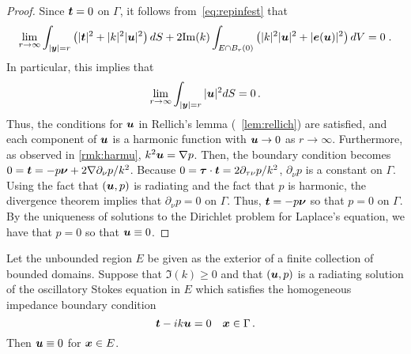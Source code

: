 \begin{proof}
Since ${\boldsymbol t} = 0$ on $\Gamma$, it follows
from~\cref{eq:repinfest} that
\begin{equation}
\lim_{r\to\infty}
\int_{|{\boldsymbol y}|=r} \left( |{\boldsymbol t}|^2 + |k|^2 |{\boldsymbol u}|^2 \right) dS +
2 {\textrm{\textup{Im}}}(k) \int_{E \cap B_{r}(0)} \left(|k|^2 |{\boldsymbol u}|^2 + |{\boldsymbol e}({\boldsymbol u})|^2 \right)
dV = 0 \; . \nonumber
\end{equation} 
In particular, this implies that
\begin{equation}
\lim_{r\to\infty} \int_{|{\boldsymbol y}|=r} |{\boldsymbol u}|^2 dS = 0 \, . \nonumber
\end{equation}
Thus, the conditions for ${\boldsymbol u}$ in Rellich's lemma (~\cref{lem:rellich})
are satisfied, and each component of ${\boldsymbol u}$ is a harmonic function
with ${\boldsymbol u} \to 0$ as $r \to \infty$. Furthermore, as observed
in \cref{rmk:harmu}, $k^2 {\boldsymbol u} = \nabla p$. Then, the boundary
condition becomes $0 = {\boldsymbol t} = -p {\boldsymbol \nu} + 2 \nabla \partial_\nu p/k^2$.
Because $0 = {\boldsymbol \tau} \cdot {\boldsymbol t} = 2\partial_{\tau\nu} p/k^2$,
$\partial_\nu p $ is a constant on $\Gamma$. Using the
fact that $({\boldsymbol u},p)$ is radiating and the fact that $p$ is harmonic,
the divergence theorem implies that $\partial_\nu p=0$ on $\Gamma$.
Thus, ${\boldsymbol t} = -p{\boldsymbol \nu}$ so that $p = 0$ on $\Gamma$. By the uniqueness
of solutions to the Dirichlet problem for Laplace's equation,
we have that $p=0$ so that ${\boldsymbol u} \equiv 0$.
\end{proof}

\begin{thrm}
  Let the unbounded region $E$ be given as the exterior
  of a finite collection of bounded domains.
  Suppose that $\Im(k) \geq 0$ and that
  $({\boldsymbol u},p)$ is a radiating solution of the
  oscillatory Stokes equation in $E$ which satisfies
  the homogeneous impedance boundary condition
  \begin{equation}
{\boldsymbol t} - i k {\boldsymbol u} = 0 \quad {\boldsymbol x} \in \Gamma \, . \nonumber
\end{equation}
Then ${\boldsymbol u} \equiv 0$ for ${\boldsymbol x} \in E$.
\end{thrm}

